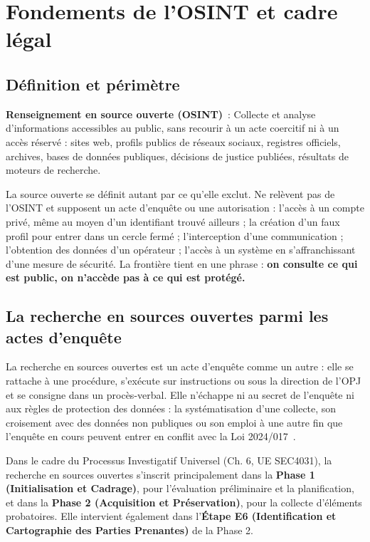 \section{Fondements de l'OSINT et cadre légal}

\subsection{Définition et périmètre}

\begin{boxdef}
\textbf{Renseignement en source ouverte (OSINT)}~:
Collecte et analyse d'informations accessibles au public, sans recourir à un acte coercitif ni à un accès réservé : sites web, profils publics de réseaux sociaux, registres officiels, archives, bases de données publiques, décisions de justice publiées, résultats de moteurs de recherche.
\end{boxdef}

La source ouverte se définit autant par ce qu'elle exclut. Ne relèvent pas de l'OSINT et supposent un acte d'enquête ou une autorisation : l'accès à un compte privé, même au moyen d'un identifiant trouvé ailleurs ; la création d'un faux profil pour entrer dans un cercle fermé ; l'interception d'une communication ; l'obtention des données d'un opérateur ; l'accès à un système en s'affranchissant d'une mesure de sécurité. La frontière tient en une phrase : \textbf{on consulte ce qui est public, on n'accède pas à ce qui est protégé.}

\subsection{La recherche en sources ouvertes parmi les actes d'enquête}

La recherche en sources ouvertes est un acte d'enquête comme un autre : elle se rattache à une procédure, s'exécute sur instructions ou sous la direction de l'OPJ et se consigne dans un procès-verbal. Elle n'échappe ni au secret de l'enquête ni aux règles de protection des données : la systématisation d'une collecte, son croisement avec des données non publiques ou son emploi à une autre fin que l'enquête en cours peuvent entrer en conflit avec la Loi 2024/017~\cite{cameroun2024donnees}.

Dans le cadre du Processus Investigatif Universel (Ch. 6, UE SEC4031), la recherche en sources ouvertes s'inscrit principalement dans la \textbf{Phase 1 (Initialisation et Cadrage)}, pour l'évaluation préliminaire et la planification, et dans la \textbf{Phase 2 (Acquisition et Préservation)}, pour la collecte d'éléments probatoires. Elle intervient également dans l'\textbf{Étape E6 (Identification et Cartographie des Parties Prenantes)} de la Phase 2.

